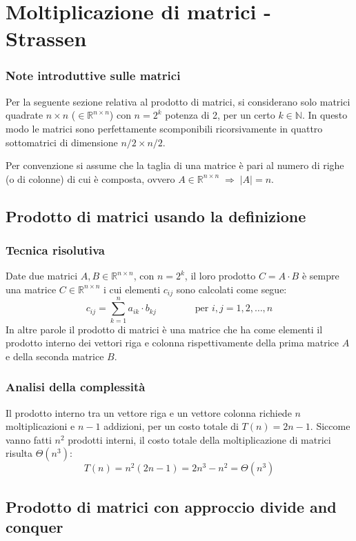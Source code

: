 \section{Moltiplicazione di matrici - Strassen}
\subsubsection*{Note introduttive sulle matrici}
Per la seguente sezione relativa al prodotto di matrici, si considerano solo matrici quadrate \(n \times n\)
(\(\in \mathbb{R}^{n \times n}\)) con \(n = 2^k\) potenza di 2, per un certo \(k \in \mathbb{N}\). In questo modo
le matrici sono perfettamente scomponibili ricorsivamente in quattro sottomatrici di dimensione \(n/2 \times n/2\).

Per convenzione si assume che la taglia di una matrice è pari al numero di righe (o di colonne) di cui è composta,
ovvero \(A \in \mathbb{R}^{n \times n} \;\Rightarrow\; |A| = n\).

\subsection{Prodotto di matrici usando la definizione}
\subsubsection*{Tecnica risolutiva}
Date due matrici \(A, B \in \mathbb{R}^{n \times n}\), con \(n = 2^k\), il loro prodotto \(C = A \cdot B\) è sempre una
matrice \(C \in \mathbb{R}^{n \times n}\) i cui elementi \(c_{ij}\) sono calcolati come segue:
\[c_{ij} = \sum_{k=1}^{n} a_{ik} \cdot b_{kj} \qquad\qquad \text{per } i, j = 1, 2, \dotsc, n\]
In altre parole il prodotto di matrici è una matrice che ha come elementi il prodotto interno dei vettori riga e colonna
rispettivamente della prima matrice \(A\) e della seconda matrice \(B\).

\subsubsection*{Analisi della complessità}
Il prodotto interno tra un vettore riga e un vettore colonna richiede \(n\) moltiplicazioni e \(n-1\) addizioni, per un costo
totale di \(T(n) = 2n - 1\). Siccome vanno fatti \(n^2\) prodotti interni, il costo totale della moltiplicazione di matrici
risulta \(\Theta(n^3)\): \[T(n) = n^2 (2n - 1) = 2n^3 - n^2 = \Theta(n^3)\]

\subsection{Prodotto di matrici con approccio divide and conquer}
